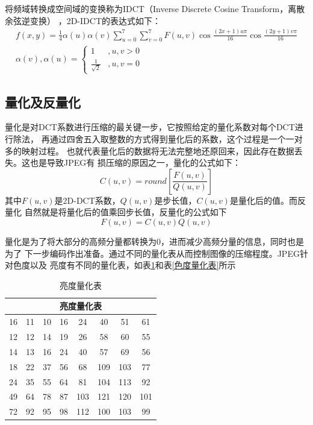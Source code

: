 \documentclass{article}
\numberwithin {equation}{section}
\begin{document}
\begin{spacing}{1.25}
    将频域转换成空间域的变换称为IDCT（Inverse Discrete Cosine Transform，离散余弦逆变换）
    ，2D-IDCT的表达式如下：
    \begin{equation}
      \begin{gathered}
        f(x,y)=\frac{1}{4}\alpha(u)\alpha(v)\sum_{u=0}^{7}\sum_{v=0}^{7}
        F(u,v)\cos\frac{(2x+1)u\pi}{16}\cos\frac{(2y+1)v\pi}{16}\\
          \alpha (v),\alpha (u) = \begin{cases}
            1 &,u,v>0\\
            \frac{1}{\sqrt{2}} &,u,v=0
          \end{cases}
      \end{gathered}
    \end{equation}
  \subsection{量化及反量化}
    \vspace{1em}
    量化是对DCT系数进行压缩的最关键一步，它按照给定的量化系数对每个DCT进行除法，
    再通过四舍五入取整数的方式得到量化后的系数，这个过程是一个一对多的映射过程。
    也就代表量化后的数据将无法完整地还原回来，因此存在数据丢失。这也是导致JPEG有
    损压缩的原因之一，量化的公式如下：
    \begin{equation}
      C(u,v)=round\left[\frac{F(u,v)}{Q(u,v)}\right]
    \end{equation}
    其中$F(u,v)$是2D-DCT系数，$Q(u,v)$是步长值，$C(u,v)$是量化后的值。而反量化
    自然就是将量化后的值乘回步长值，反量化的公式如下
    \begin{equation}
      F(u,v)=C(u,v)Q(u,v)
    \end{equation}

    量化是为了将大部分的高频分量都转换为0，进而减少高频分量的信息，同时也是为了
    下一步编码作出准备。通过不同的量化表从而控制图像的压缩程度。JPEG针对色度以及
    亮度有不同的量化表，如表\ref{亮度量化表}和表\ref{色度量化表}所示

    \begin{table}[H]
      \caption{亮度量化表}
      \label{亮度量化表}
      \centering
      \begin{tabular}{cccccccc}
        \toprule
        \multicolumn{8}{c}{亮度量化表}\\
        \midrule
        16 & 11 & 10 & 16 & 24 & 40 & 51 & 61 \\
        12 & 12 & 14 & 19 & 26 & 58 & 60 & 55 \\
        14 & 13 & 16 & 24 & 40 & 57 & 69 & 56 \\
        18 & 22 & 37 & 56 & 68 & 109 & 103 & 77 \\
        24 & 35 & 55 & 64 & 81 & 104 & 113 & 92 \\
        49 & 64 & 78 & 87 & 103 & 121 & 120 & 101 \\
        72 & 92 & 95 & 98 & 112 & 100 & 103 & 99 \\
        \bottomrule
      \end{tabular}
    \end{table}


\end{spacing}
\end{document}
